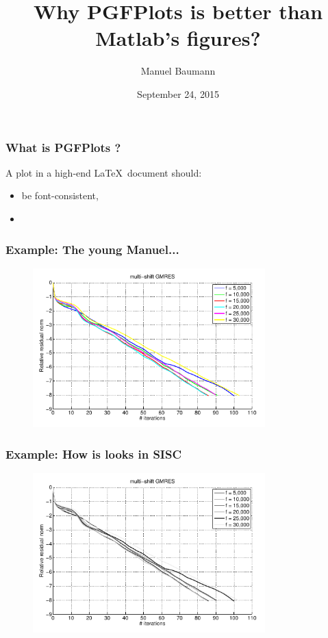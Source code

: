 \documentclass{beamer}
\title{\huge{Why PGFPlots is better than Matlab's figures?}}
\author{Manuel Baumann}
\date{\footnotesize{September 24, 2015}}
\begin{document}
\frame{\titlepage}
\begin{frame}
\frametitle{What is PGFPlots ?}
A plot in a high-end \LaTeX \ document should:
\begin{itemize}
 \item be font-consistent,
 \item 
\end{itemize}
\end{frame}

\begin{frame}
\frametitle{Example: The young Manuel...}
\begin{figure}
 \includegraphics[width=0.8\textwidth]{images/matlab.png}
\end{figure}
\end{frame}

\begin{frame}
\frametitle{Example: How is looks in SISC}
\begin{figure}
 \includegraphics[width=0.8\textwidth]{images/matlab_bw.png}
\end{figure}
\end{frame}
\end{document}
